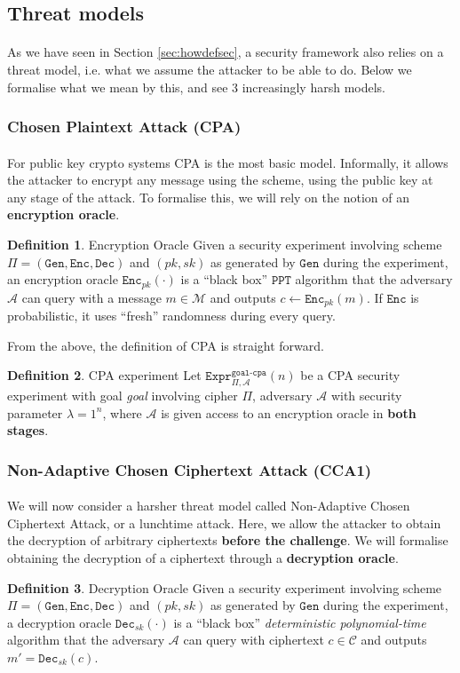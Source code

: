 \documentclass{article}
\theoremstyle{definition}
\newtheorem{definition}{Definition}[section]
\newcommand{\Enc}{\texttt{Enc}}
\newcommand{\Dec}{\texttt{Dec}}
\newcommand{\Gen}{\texttt{Gen}}
\newcommand{\M}{\mathcal{M}}
\renewcommand{\C}{\mathcal{C}}
\newcommand{\A}{\mathcal{A}}
\newcommand{\PPT}{\texttt{PPT}}
\newcommand{\Expr}[2]{\texttt{Expr}^{\texttt{#1}}_{#2}}
\begin{document}
\subsection{Threat models}
\paragraph{} As we have seen in Section \ref{sec:howdefsec}, a security
framework also relies on a threat model, i.e. what we assume the attacker to be
able to do. Below we formalise what we mean by this, and see 3 increasingly
harsh models.
\subsubsection{Chosen Plaintext Attack (CPA)}
\paragraph{} For public key crypto systems CPA is the most basic model.
Informally, it allows the attacker to encrypt any message using the scheme,
using the public key at any stage of the attack. To formalise this, we will rely
on the notion of an \textbf{encryption oracle}.
\begin{definition}{Encryption Oracle}
  Given a security experiment involving scheme $\Pi = (\Gen, \Enc, \Dec)$ and
  $(pk, sk)$ as generated by $\Gen$ during the experiment, an encryption oracle
  $\Enc_{pk}(\cdot)$ is a ``black box'' $\PPT$ algorithm that the adversary $\A$ 
  can query with a message $m\in \M$ and outputs $c \leftarrow \Enc_{pk}(m)$. If
  $\Enc$ is probabilistic, it uses ``fresh'' randomness during every query.
\end{definition}
From the above, the definition of CPA is straight forward.
\begin{definition}{CPA experiment}
  Let $\Expr{goal-cpa}{\Pi, \A}(n)$ be a CPA security experiment with goal
  \textit{goal} involving cipher $\Pi$, adversary $\A$ with security parameter $\lambda = 1^n$, where
  $\A$ is given access to an encryption oracle in \textbf{both stages}.
\end{definition}
\subsubsection{Non-Adaptive Chosen Ciphertext Attack (CCA1)}
\paragraph{} We will now consider a harsher threat model called Non-Adaptive
Chosen Ciphertext Attack, or a lunchtime attack. Here, we allow the attacker to
obtain the decryption of arbitrary ciphertexts \textbf{before the challenge}.
We will formalise obtaining the decryption of a ciphertext through a
\textbf{decryption oracle}.
\begin{definition}{Decryption Oracle}
  Given a security experiment involving scheme $\Pi = (\Gen, \Enc, \Dec)$ and
  $(pk, sk)$ as generated by $\Gen$ during the experiment, a decryption oracle
  $\Dec_{sk}(\cdot)$ is a ``black box'' \textit{deterministic polynomial-time}
  algorithm that the adversary $\A$ can query with ciphertext $c\in \C$ and
  outputs $m' = \Dec_{sk}(c)$.
\end{definition}
\end{document}
